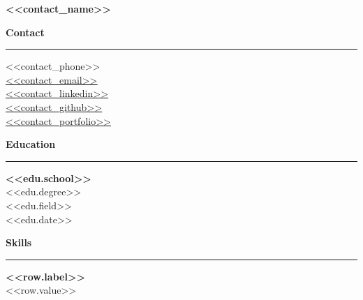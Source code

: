 \documentclass[10pt]{article}
\newcommand{\cvsection}[1]{%
  \vspace{7pt}%
  {\large\bf #1}%
  \vspace{2pt}%
  \hrule%
  \vspace{5pt}%
}
\newcommand{\tagged}[2]{\hypertarget{#1}{#2}}
\begin{document}
\begin{tcolorbox}[
  enhanced,
  sidebyside,
  sidebyside align=top,
  sidebyside gap=0mm,
  lefthand ratio=0.30,
  colback=sidebarcolor,
  colbacklower=white,
  colframe=white,
  segmentation style={solid, draw=gray, line width=0.4pt},
  boxrule=0pt,
  left=6pt, right=6pt, top=0pt, bottom=0pt,
  lower separated=false,
  height fill
]


\begin{tcolorbox}[
  enhanced,
  colback=headercolor,
  colframe=headercolor,
  boxrule=0pt,
  left=4pt, right=4pt, top=6pt, bottom=6pt,
  sharp corners
]
  {\LARGE\bf\color{white}\centering \tagged{contact_name}{<<contact_name>>}\par}
\end{tcolorbox}

\cvsection{Contact}
{\fontsize{8.5}{12}\selectfont
\tagged{contact_phone}{<<contact_phone>>} \\[2pt]
\underline{\href{mailto:<<contact_email_raw>>}{\tagged{contact_email}{<<contact_email>>}}} \\[2pt]
\underline{\href{<<contact_linkedin_url>>}{\tagged{contact_linkedin}{<<contact_linkedin>>}}} \\[2pt]
\underline{\href{<<contact_github_url>>}{\tagged{contact_github}{<<contact_github>>}}} \\[2pt]
\underline{\href{<<contact_portfolio_url>>}{\tagged{contact_portfolio}{<<contact_portfolio>>}}}
}

\cvsection{Education}
{\fontsize{9.5}{13}\bf \tagged{<<edu.id>>_school}{<<edu.school>>}} \\[2pt]
{\fontsize{8.5}{11}\selectfont \tagged{<<edu.id>>_degree}{<<edu.degree>>}} \\[2pt]
{\fontsize{8}{10}\selectfont \tagged{<<edu.id>>_field}{<<edu.field>>}} \\[2pt]
{\fontsize{8}{10}\selectfont \tagged{<<edu.id>>_date}{<<edu.date>>}}
\vspace{5pt}

\cvsection{Skills}
{\fontsize{8}{12}\selectfont
{\bf \tagged{<<row.id>>_label}{<<row.label>>}} \\[1pt]
\tagged{<<row.id>>_value}{<<row.value>>}
\vspace{5pt}
}

\tcblower


\end{tcolorbox}
\end{document}
